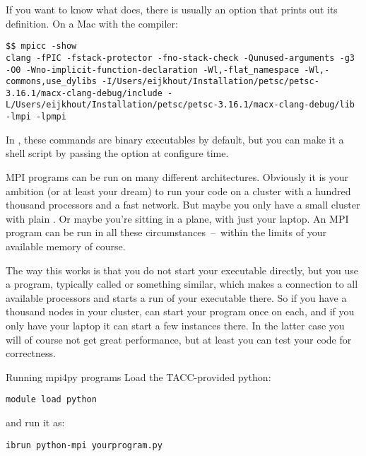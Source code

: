 If you want to know what  does,
there is usually an option that prints out its definition.
On a Mac with the  compiler:
\begin{verbatim}
$$ mpicc -show
clang -fPIC -fstack-protector -fno-stack-check -Qunused-arguments -g3 -O0 -Wno-implicit-function-declaration -Wl,-flat_namespace -Wl,-commons,use_dylibs -I/Users/eijkhout/Installation/petsc/petsc-3.16.1/macx-clang-debug/include -L/Users/eijkhout/Installation/petsc/petsc-3.16.1/macx-clang-debug/lib -lmpi -lpmpi
\end{verbatim}

\begin{remark}
  In , these commands are 
  binary executables by default,
  but you can make it a shell script by passing the
   option at configure time.
\end{remark}

MPI programs can be run on many different architectures. Obviously it
is your ambition (or at least your dream) to run your code on a
cluster with a hundred thousand processors and a fast network. But
maybe you only have a small cluster with
plain . Or maybe you're sitting in a plane, with
just your laptop. An MPI program can be run in all these
circumstances~--~within the limits of your available memory of course.

The way this works is that you do not start your executable directly,
but you use a program, typically called  or
something similar, which makes a connection to all available
processors and starts a run of your executable there. So if you have a
thousand nodes in your cluster,  can start your program once
on each, and if you only have your laptop it can start a few instances
there. In the latter case you will of course not get great
performance, but at least you can test your code for correctness.

\begin{tacc}
\begin{pythonnote}{Running mpi4py programs}
    Load the TACC-provided python:
\begin{verbatim}
module load python
\end{verbatim}
and run it as:
\begin{verbatim}
ibrun python-mpi yourprogram.py
\end{verbatim}
\end{pythonnote}
\end{tacc}

